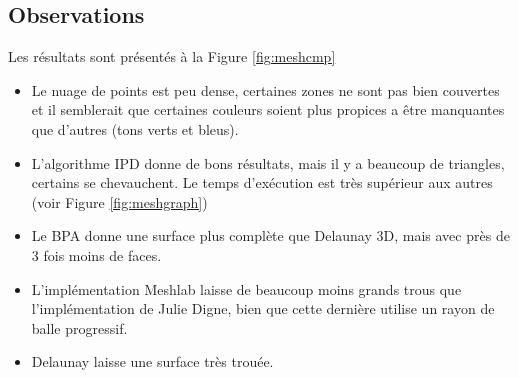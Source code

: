 \documentclass[a4paper,10pt]{report}
\begin{document}
\subsection{Observations}
Les résultats sont présentés à la Figure \ref{fig:meshcmp}
\begin{itemize}
	\item Le nuage de points est peu dense, certaines zones ne sont pas bien couvertes et il semblerait que certaines couleurs soient plus propices a être manquantes que d'autres (tons verts et bleus).
    \item L'algorithme IPD donne de bons résultats, mais il y a beaucoup de triangles, certains se chevauchent. Le temps d'exécution est très supérieur aux autres (voir Figure \ref{fig:meshgraph})
    \item Le BPA donne une surface plus complète que Delaunay 3D, mais avec près de 3 fois moins de faces.
    \item L'implémentation Meshlab laisse de beaucoup moins grands trous que l'implémentation de Julie Digne, bien que cette dernière utilise un rayon de balle progressif.
    \item Delaunay laisse une surface très trouée.
\end{itemize}
\end{document}
